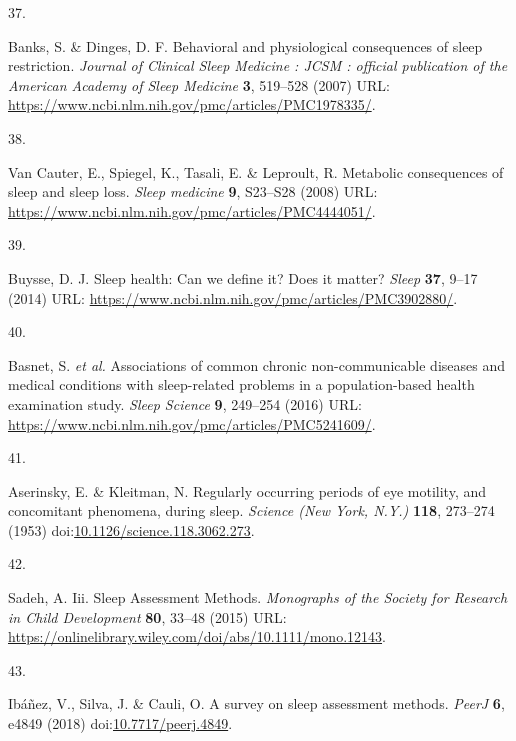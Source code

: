\documentclass[
  10pt,
]{scrbook}
\newlength{\cslhangindent}
\newlength{\csllabelwidth}
\newlength{\cslentryspacingunit} %
\newenvironment{CSLReferences}[2] %
 {%
  \setlength{\parindent}{0pt}
  \ifodd #1
  \let\oldpar\par
  \def\par{\hangindent=\cslhangindent\oldpar}
  \fi
  \setlength{\parskip}{#2\cslentryspacingunit}
 }%
 {}
\newcommand{\CSLLeftMargin}[1]{\parbox[t]{\csllabelwidth}{#1}}
\newcommand{\CSLRightInline}[1]{\parbox[t]{\linewidth - \csllabelwidth}{#1}\break}
\begin{document}
\begin{CSLReferences}{0}{0}
\leavevmode{}%
\CSLLeftMargin{37. }%
\CSLRightInline{Banks, S. \& Dinges, D. F. Behavioral and physiological
consequences of sleep restriction. \emph{Journal of Clinical Sleep
Medicine : JCSM : official publication of the American Academy of Sleep
Medicine} \textbf{3}, 519--528 (2007) URL:
\url{https://www.ncbi.nlm.nih.gov/pmc/articles/PMC1978335/}.}

\leavevmode{}%
\CSLLeftMargin{38. }%
\CSLRightInline{Van Cauter, E., Spiegel, K., Tasali, E. \& Leproult, R.
Metabolic consequences of sleep and sleep loss. \emph{Sleep medicine}
\textbf{9}, S23--S28 (2008) URL:
\url{https://www.ncbi.nlm.nih.gov/pmc/articles/PMC4444051/}.}

\leavevmode{}%
\CSLLeftMargin{39. }%
\CSLRightInline{Buysse, D. J. Sleep health: Can we define it? Does it
matter? \emph{Sleep} \textbf{37}, 9--17 (2014) URL:
\url{https://www.ncbi.nlm.nih.gov/pmc/articles/PMC3902880/}.}

\leavevmode{}%
\CSLLeftMargin{40. }%
\CSLRightInline{Basnet, S. \emph{et al.} Associations of common chronic
non-communicable diseases and medical conditions with sleep-related
problems in a population-based health examination study. \emph{Sleep
Science} \textbf{9}, 249--254 (2016) URL:
\url{https://www.ncbi.nlm.nih.gov/pmc/articles/PMC5241609/}.}

\leavevmode{}%
\CSLLeftMargin{41. }%
\CSLRightInline{Aserinsky, E. \& Kleitman, N. Regularly occurring
periods of eye motility, and concomitant phenomena, during sleep.
\emph{Science (New York, N.Y.)} \textbf{118}, 273--274 (1953)
doi:\href{https://doi.org/10.1126/science.118.3062.273}{10.1126/science.118.3062.273}.}

\leavevmode{}%
\CSLLeftMargin{42. }%
\CSLRightInline{Sadeh, A. Iii. Sleep Assessment Methods.
\emph{Monographs of the Society for Research in Child Development}
\textbf{80}, 33--48 (2015) URL:
\url{https://onlinelibrary.wiley.com/doi/abs/10.1111/mono.12143}.}

\leavevmode{}%
\CSLLeftMargin{43. }%
\CSLRightInline{Ibáñez, V., Silva, J. \& Cauli, O. A survey on sleep
assessment methods. \emph{PeerJ} \textbf{6}, e4849 (2018)
doi:\href{https://doi.org/10.7717/peerj.4849}{10.7717/peerj.4849}.}


\end{CSLReferences}
\end{document}
